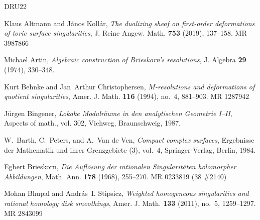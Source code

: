\documentclass{amsart}
\theoremstyle{definition}
\theoremstyle{remark}
\begin{document}
 \def\cprime{$'$} \def\cprime{$'$} \def\cprime{$'$} \def\cprime{$'$}
  \def\cprime{$'$} \def\dbar{\leavevmode\hbox to 0pt{\hskip.2ex
  \accent"16\hss}d} \def\cprime{$'$} \def\cprime{$'$}
  \def\polhk#1{\setbox0=\hbox{#1}{\ooalign{\hidewidth
  \lower1.5ex\hbox{`}\hidewidth\crcr\unhbox0}}} \def\cprime{$'$}
  \def\cprime{$'$} \def\cprime{$'$} \def\cprime{$'$}
  \def\polhk#1{\setbox0=\hbox{#1}{\ooalign{\hidewidth
  \lower1.5ex\hbox{`}\hidewidth\crcr\unhbox0}}} \def\cdprime{$''$}
  \def\cprime{$'$} \def\cprime{$'$} \def\cprime{$'$} \def\cprime{$'$}
\providecommand{\bysame}{\leavevmode\hbox to3em{\hrulefill}\thinspace}
\providecommand{\MR}{\relax\ifhmode\unskip\space\fi MR }
\providecommand{\MRhref}[2]{%
  \href{http://www.ams.org/mathscinet-getitem?mr=#1}{#2}
}
\providecommand{\href}[2]{#2}
\begin{thebibliography}{DRU22}

Klaus Altmann and J{\'a}nos Koll{\'a}r, \emph{The dualizing sheaf on
  first-order deformations of toric surface singularities}, J. Reine Angew.
  Math. \textbf{753} (2019), 137--158. \MR{3987866}

Michael Artin, \emph{Algebraic construction of {B}rieskorn's resolutions}, J.
  Algebra \textbf{29} (1974), 330--348.

Kurt Behnke and Jan~Arthur Christophersen, \emph{{$M$}-resolutions and
  deformations of quotient singularities}, Amer. J. Math. \textbf{116} (1994),
  no.~4, 881--903. \MR{1287942}

J\"urgen Bingener, \emph{Lokake {M}odulr\"aume in den analytischen {G}eometrie
  {I}--{II}}, Aspects of math., vol. 302, Viehweg, Braunschweig, 1987.

W.~Barth, C.~Peters, and A.~V{an de Ven}, \emph{Compact complex surfaces},
  Ergebnisse der Mathematik und ihrer Grenzgebiete (3), vol.~4,
  Springer-Verlag, Berlin, 1984.

Egbert Brieskorn, \emph{Die {A}ufl\"osung der rationalen {S}ingularit\"aten
  holomorpher {A}bbildungen}, Math. Ann. \textbf{178} (1968), 255--270.
  \MR{0233819 (38 \#2140)}

Mohan Bhupal and Andr\'{a}s~I. Stipsicz, \emph{Weighted homogeneous
  singularities and rational homology disk smoothings}, Amer. J. Math.
  \textbf{133} (2011), no.~5, 1259--1297. \MR{2843099}


\end{thebibliography}
\end{document}
